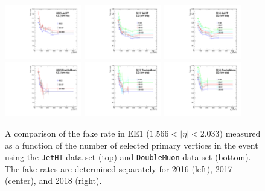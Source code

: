 \begin{figure}[!htbp]
\caption{A comparison of the fake rate in EE1 ($1.566 < |\eta| < 2.033$) measured as a function of the number of selected primary vertices in the event using the \texttt{JetHT} data set (top) and \texttt{DoubleMuon} data set (bottom). The fake rates are determined separately for 2016 (left), 2017 (center), and 2018 (right).}
\centering
\includegraphics[width=0.3\textwidth]{fig/compare_pv_EE1_2016_jetht.pdf}
\includegraphics[width=0.3\textwidth]{fig/compare_pv_EE1_2017_jetht.pdf}
\includegraphics[width=0.3\textwidth]{fig/compare_pv_EE1_2018_jetht.pdf}
\includegraphics[width=0.3\textwidth]{fig/compare_pv_EE1_2016_doublemuon.pdf}
\includegraphics[width=0.3\textwidth]{fig/compare_pv_EE1_2017_doublemuon.pdf}
\includegraphics[width=0.3\textwidth]{fig/compare_pv_EE1_2018_doublemuon.pdf}
\label{fig:frpileup_EE1}
\end{figure}


